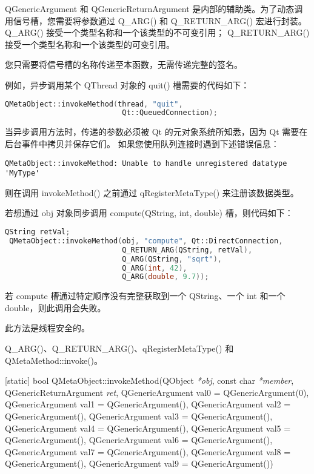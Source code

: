 QGenericArgument 和 QGenericReturnArgument 是内部的辅助类。为了动态调用信号槽，您需要将参数通过 Q\_ARG() 和 Q\_RETURN\_ARG() 宏进行封装。
Q\_ARG() 接受一个类型名称和一个该类型的不可变引用；
Q\_RETURN\_ARG() 接受一个类型名称和一个该类型的可变引用。

您只需要将信号槽的名称传递至本函数，无需传递完整的签名。

例如，异步调用某个 QThread 对象的 quit() 槽需要的代码如下：

\begin{lstlisting}[language=C++]
QMetaObject::invokeMethod(thread, "quit",
                           Qt::QueuedConnection);
\end{lstlisting}

当异步调用方法时，传递的参数必须被 Qt 的元对象系统所知悉，因为 Qt 需要在后台事件中拷贝并保存它们。
如果您使用队列连接时遇到下述错误信息：

\begin{lstlisting}
QMetaObject::invokeMethod: Unable to handle unregistered datatype 'MyType'
\end{lstlisting}

则在调用 invokeMethod() 之前通过 qRegisterMetaType() 来注册该数据类型。

若想通过 obj 对象同步调用 compute(QString, int, double) 槽，则代码如下：

\begin{lstlisting}[language=C++]
 QString retVal;
 QMetaObject::invokeMethod(obj, "compute", Qt::DirectConnection,
                           Q_RETURN_ARG(QString, retVal),
                           Q_ARG(QString, "sqrt"),
                           Q_ARG(int, 42),
                           Q_ARG(double, 9.7));
\end{lstlisting}

若 compute 槽通过特定顺序没有完整获取到一个 QString、一个 int 和一个 double，则此调用会失败。

\begin{notice}
此方法是线程安全的。
\end{notice}

\begin{notice}[另请参阅]
Q\_ARG()、Q\_RETURN\_ARG()、qRegisterMetaType() 和 QMetaMethod::invoke()。
\end{notice}


[static] bool QMetaObject::invokeMethod(QObject \emph{*obj}, const char \emph{*member}, QGenericReturnArgument \emph{ret}, 
QGenericArgument val0 = QGenericArgument(0), QGenericArgument val1 = QGenericArgument(), 
QGenericArgument val2 = QGenericArgument(), 
QGenericArgument val3 = QGenericArgument(), QGenericArgument val4 = QGenericArgument(), 
QGenericArgument val5 = QGenericArgument(), QGenericArgument val6 = QGenericArgument(), 
QGenericArgument val7 = QGenericArgument(), QGenericArgument val8 = QGenericArgument(), 
QGenericArgument val9 = QGenericArgument())

